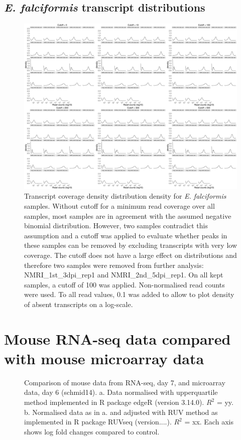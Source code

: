 \documentclass{article}
\begin{document}
\subsection{\textit{E. falciformis} transcript distributions}
\begin{figure}[H]
\begin{center}
\includegraphics[width=\textwidth]{distributionsEf.pdf}
\caption{Transcript coverage density distribution density for \textit{E. falciformis} samples. Without cutoff for a minimum read coverage over all samples, most samples are in agreement with the assumed negative binomial distribution. However, two samples contradict this assumption and a cutoff was applied to evaluate whether peaks in these samples can be removed by excluding transcripts with very low coverage. The cutoff does not have a large effect on distributions and therefore two samples were removed from further 
analysis: NMRI\_1st\_3dpi\_rep1 and NMRI\_2nd\_5dpi\_rep1. On all kept samples, a cutoff of 100 was applied. Non-normalised read counts were used. To all read values, 0.1 was added to allow to plot density of absent transcripts on a log-scale.}
\end{center}
\end{figure}

\section{Mouse RNA-seq data compared with mouse microarray data}
\begin{figure}[H]
\begin{center}
\caption{Comparison of mouse data from RNA-seq, day 7, and microarray data, day 6 (schmid14). a. Data normalised with upperquartile method implemented in R package edgeR (version 3.14.0). $R^2$ = yy.	b. Normalised data as in a. and adjusted with RUV method as implemented in R package RUVseq (version....). $R^2$ = xx. Each axis shows log fold changes compared to control.}
\end{center}
\end{figure}
\end{document}
